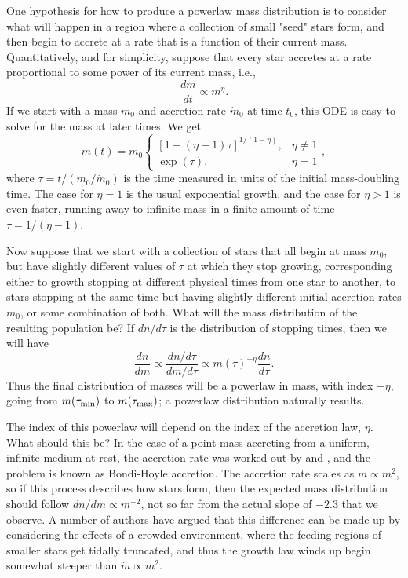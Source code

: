 One hypothesis for how to produce a powerlaw mass distribution is to consider what will happen in a region where a collection of small "seed" stars form, and then begin to accrete at a rate that is a function of their current mass. Quantitatively, and for simplicity, suppose that every star accretes at a rate proportional to some power of its current mass, i.e.,
\begin{equation}
\frac{dm}{dt} \propto m^\eta.
\end{equation}
If we start with a mass $m_0$ and accretion rate $\dot{m}_0$ at time $t_0$, this ODE is easy to solve for the mass at later times. We get
\begin{equation}
m(t) = m_0 \left\{
\begin{array}{ll}
[1 - (\eta-1)\tau]^{1/(1-\eta)}, & \eta \neq 1 \\
\exp(\tau), & \eta = 1
\end{array}
\right.,
\end{equation}
where $\tau = t / (m_0/\dot{m}_0)$ is the time measured in units of the initial mass-doubling time. The case for $\eta = 1$ is the usual exponential growth, and the case for $\eta > 1$ is even faster, running away to infinite mass in a finite amount of time $\tau = 1/(\eta-1)$.

Now suppose that we start with a collection of stars that all begin at mass $m_0$, but have slightly different values of $\tau$ at which they stop growing, corresponding either to growth stopping at different physical times from one star to another, to stars stopping at the same time but having slightly different initial accretion rates $\dot{m}_0$, or some combination of both. What will the mass distribution of the resulting population be? If $dn/d\tau$ is the distribution of stopping times, then we will have
\begin{equation}
\frac{dn}{dm} \propto \frac{dn/d\tau}{dm/d\tau} \propto m(\tau)^{-\eta} \frac{dn}{d\tau}.
\end{equation}
Thus the final distribution of masses will be a powerlaw in mass, with index $-\eta$, going from $m(\tau_{\rm min})$ to $m(\tau_{\rm max})$; a powerlaw distribution naturally results.

The index of this powerlaw will depend on the index of the accretion law, $\eta$. What should this be? In the case of a point mass accreting from a uniform, infinite medium at rest, the accretion rate was worked out by \citet{hoyle46a} and \citet{bondi52a}, and the problem is known as Bondi-Hoyle accretion. The accretion rate scales as $\dot{m} \propto m^2$, so if this process describes how stars form, then the expected mass distribution should follow $dn/dm\propto m^{-2}$, not so far from the actual slope of $-2.3$ that we observe. A number of authors have argued that this difference can be made up by considering the effects of a crowded environment, where the feeding regions of smaller stars get tidally truncated, and thus the growth law winds up begin somewhat steeper than $\dot{m}\propto m^2$.

